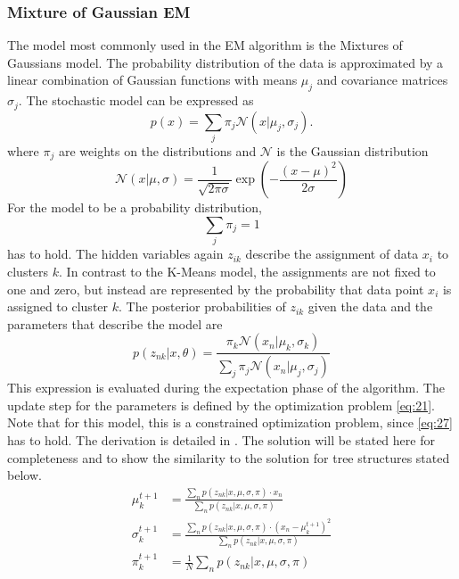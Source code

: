 \subsubsection{Mixture of Gaussian EM}
\label{sec:mixture-gaussian-em}
The model most commonly used in the EM algorithm is the Mixtures of Gaussians model.
The probability distribution of the data is approximated by a linear combination of Gaussian functions with means $\mu_j$ and covariance matrices $\sigma_j$.
The stochastic model can be expressed as
\begin{equation}
  \label{eq:22}
  p(x) = \sum_{j}\pi_j\mathcal{N}(x|\mu_j,\sigma_j).
\end{equation}
where $\pi_j$ are weights on the distributions and $\mathcal{N}$ is the Gaussian distribution
\begin{equation}
  \label{eq:25}
  \mathcal{N}(x|\mu,\sigma) = \frac{1}{\sqrt{2\pi\sigma}}\exp\left(-\frac{(x-\mu)^2}{2\sigma}\right)
\end{equation}
For the model to be a probability distribution,
\begin{equation}
  \label{eq:27}
  \sum_j\pi_j = 1
\end{equation}
has to hold.
The hidden variables again $z_{ik}$ describe the  assignment of data $x_i$ to clusters $k$.
In contrast to the K-Means model, the assignments are not fixed to one and zero, but instead are represented by the probability that data point $x_i$ is assigned to cluster $k$.
The posterior probabilities of $z_{ik}$ given the data and the parameters that describe the model are
\begin{equation}
  \label{eq:26}
  p(z_{nk}|x, \theta) = \frac{\pi_k\mathcal{N}(x_n|\mu_k,\sigma_k)}{\sum_j\pi_j\mathcal{N}(x_n|\mu_j, \sigma_j)}
\end{equation}
This expression is evaluated during the expectation phase of the algorithm.
The update step for the parameters is defined by the optimization problem \eqref{eq:21}.
Note that for this model, this is a constrained optimization problem, since \eqref{eq:27} has to hold.
The derivation is detailed in \cite{Bishop2006}.
The solution will be stated here for completeness and to show the similarity to the solution for tree structures stated below.
\begin{align}
  \label{eq:29}
  \mu_k^{t+1} &= \frac{\sum_np(z_{nk}|x, \mu, \sigma, \pi)\cdot x_n}{\sum_np(z_{nk}|x, \mu, \sigma, \pi)}\\
  \sigma_k^{t+1}&= \frac{\sum_np(z_{nk}|x, \mu, \sigma, \pi)\cdot (x_n-\mu_k^{t+1})^2}{\sum_np(z_{nk}|x, \mu, \sigma, \pi)}\\
  \pi_k^{t+1}&= \frac{1}{N}\sum_{n}p(z_{nk}|x, \mu, \sigma, \pi)
\end{align}

